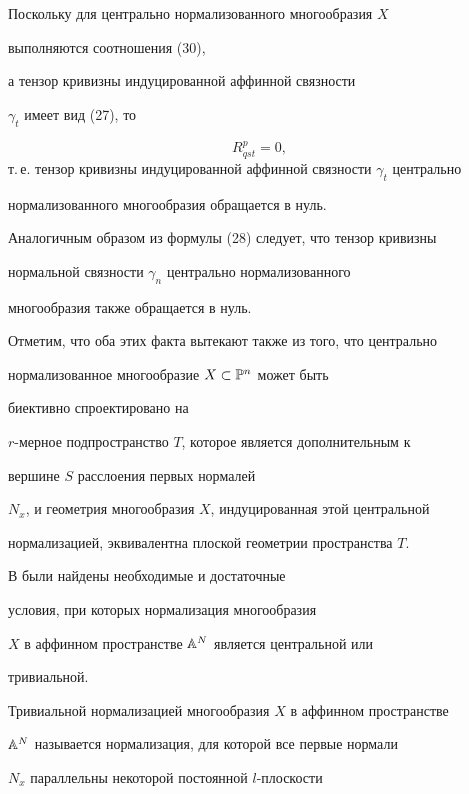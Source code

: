 \begin{pf} Поскольку для центрально нормализованного многообразия $X$


выполняются соотношения (30),


а тензор кривизны индуцированной аффинной связности


$\gamma_t$ имеет вид (27), то


$$


R^p_{qst} = 0,


$$
т.\,е. тензор кривизны индуцированной аффинной связности $\gamma_t$ центрально


нормализованного многообразия обращается в нуль.





Аналогичным образом из формулы (28) следует, что тензор кривизны


нормальной связности $\gamma_n$ центрально нормализованного


многообразия также обращается в нуль.





 Отметим, что оба этих факта вытекают также из того, что центрально


нормализованное многообразие $X \subset \Bbb{P}^n$ может быть


биективно спроектировано на


$r$-мерное подпространство $T$, которое является дополнительным к


вершине $S$ расслоения первых нормалей


$N_x$, и геометрия многообразия $X$, индуцированная этой центральной


нормализацией, эквивалентна плоской геометрии пространства $T$.


\end{pf}

В \cite{A52} были найдены необходимые и достаточные


условия, при которых нормализация многообразия


$X$ в аффинном пространстве $\Bbb{A}^{N}$ является центральной или


тривиальной.


Тривиальной нормализацией многообразия $X$ в аффинном пространстве


$\Bbb{A}^N$ называется нормализация, для которой все первые нормали


$N_x$ параллельны некоторой постоянной $l$-плоскости


